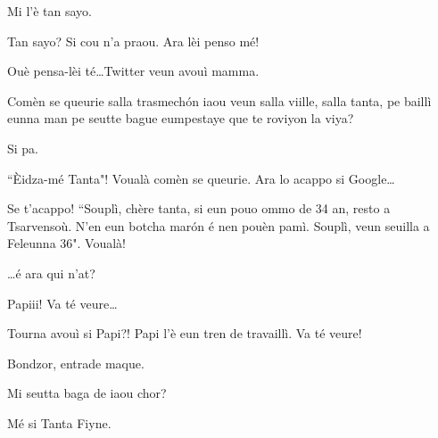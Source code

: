 \begin{drama}
\Alicespeaks Mi l'è tan sayo.

\Tanteunspeaks Tan sayo? Si cou n'a praou. Ara lèi penso mé!


\Alicespeaks Ouè pensa-lèi té\ldots Twitter veun avouì mamma.

\Tanteunspeaks Comèn se queurie salla trasmech\'on iaou veun salla viille, salla tanta, pe baillì eunna man pe seutte  bague eumpestaye que te roviyon la viya?

\Alicespeaks Si pa.

\Tanteunspeaks ``\`Eidza-mé Tanta"! Voualà comèn se queurie. Ara lo acappo si Google\ldots


\Tanteunspeaks{} Se t'acappo!  ``Souplì, chère tanta, si eun pouo ommo de 34 an, resto a Tsarvensoù. N'en eun botcha mar\'on é nen pouèn pamì. Souplì, veun seuilla a Feleunna 36". Voualà! 




\Tanteunspeaks \ldots é ara qui n'at?

\Alicespeaks Papiii! Va té veure\ldots

\Tanteunspeaks Tourna avouì si Papi?! Papi l'è eun tren de travaillì. Va té veure!


\Alicespeaks{} Bondzor, entrade maque.


\label{tata}


\Tanteunspeaks{} Mi seutta baga de iaou chor?

\Tantaspeaks{} Mé si Tanta Fiyne.


\end{drama}
